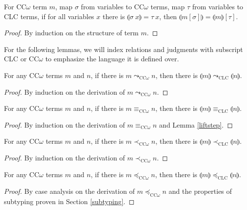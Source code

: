 \documentclass[sigplan,screen,review,anonymous]{acmart}
\newcommand{\step}{\leadsto}
\newcommand{\lift}[1]{\llparenthesis #1 \rrparenthesis}
\begin{document}
\begin{lemma}
  For CC$\omega$ term $m$, map $\sigma$ from variables to CC$\omega$ terms, map $\tau$ from variables to CLC terms, if for all variables $x$ there is $\lift{\sigma\ x} = \tau\ x$, then $\lift{m[\sigma]} = \lift{m}[\tau]$.
\end{lemma}
\begin{proof}
  By induction on the structure of term $m$.
\end{proof}
For the following lemmas, we will index relations and judgments with subscript CLC or CC$\omega$ to emphasize the language it is defined over.

\begin{lemma}\label{liftstep}
  For any CC$\omega$ terms $m$ and $n$, if there is $m \step_{\scriptscriptstyle \text{CC$\omega$}} n$, then there is $\lift{m} \step_{\scriptscriptstyle \text{CLC}} \lift{n}$.
\end{lemma}
\begin{proof}
  By induction on the derivation of $m \step_{\scriptscriptstyle \text{CC$\omega$}} n$.
\end{proof}

\begin{lemma}
  For any CC$\omega$ terms $m$ and $n$, if there is $m \equiv_{\scriptscriptstyle \text{CC$\omega$}} n$, then there is $\lift{m} \equiv_{\scriptscriptstyle \text{CLC}} \lift{n}$.
\end{lemma}
\begin{proof}
  By induction on the derivation of $m \equiv_{\scriptscriptstyle \text{CC$\omega$}} n$ and Lemma \ref{liftstep}.
\end{proof}

\begin{lemma}\label{liftsub1}
  For any CC$\omega$ terms $m$ and $n$, if there is $m \prec_{\scriptscriptstyle \text{CC$\omega$}} n$, then there is $\lift{m} \prec_{\scriptscriptstyle \text{CLC}} \lift{n}$.
\end{lemma}
\begin{proof}
  By induction on the derivation of $m \prec_{\scriptscriptstyle \text{CC$\omega$}} n$.
\end{proof}

\begin{lemma}
  For any CC$\omega$ terms $m$ and $n$, if there is $m \preceq_{\scriptscriptstyle \text{CC$\omega$}} n$, then there is $\lift{m} \preceq_{\scriptscriptstyle \text{CLC}} \lift{n}$.
\end{lemma}
\begin{proof}
  By case analysis on the derivation of $m \preceq_{\scriptscriptstyle \text{CC$\omega$}} n$ and the properties of subtyping proven in Section \ref{subtyping}.
\end{proof}
\end{document}
